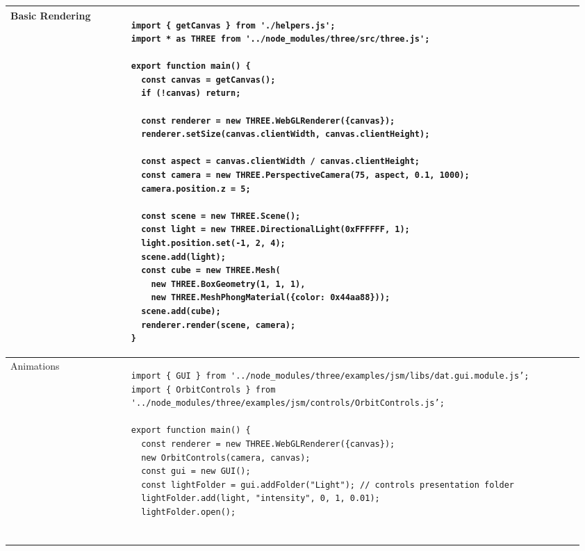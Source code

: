 \documentclass[main.tex,fontsize=8pt,paper=a4,paper=portrait,DIV=calc,]{scrartcl}
\begin{document}
\pagebreak
\begin{table}[ht!]
\begin{tabular}{|m{0.2\linewidth}|m{0.755\linewidth}|}
\hline
Basic Rendering & 
\begin{lstlisting}
import { getCanvas } from './helpers.js';
import * as THREE from '../node_modules/three/src/three.js';

export function main() {
  const canvas = getCanvas();
  if (!canvas) return;

  const renderer = new THREE.WebGLRenderer({canvas});
  renderer.setSize(canvas.clientWidth, canvas.clientHeight);
  
  const aspect = canvas.clientWidth / canvas.clientHeight;
  const camera = new THREE.PerspectiveCamera(75, aspect, 0.1, 1000);
  camera.position.z = 5;
  
  const scene = new THREE.Scene();
  const light = new THREE.DirectionalLight(0xFFFFFF, 1);
  light.position.set(-1, 2, 4);
  scene.add(light);
  const cube = new THREE.Mesh(
    new THREE.BoxGeometry(1, 1, 1),
    new THREE.MeshPhongMaterial({color: 0x44aa88}));
  scene.add(cube);
  renderer.render(scene, camera);
}
\end{lstlisting}\\
\hline
Animations & 
\begin{lstlisting}
import { GUI } from '../node_modules/three/examples/jsm/libs/dat.gui.module.js’;
import { OrbitControls } from '../node_modules/three/examples/jsm/controls/OrbitControls.js’;

export function main() {
  const renderer = new THREE.WebGLRenderer({canvas});
  new OrbitControls(camera, canvas);
  const gui = new GUI();
  const lightFolder = gui.addFolder("Light"); // controls presentation folder
  lightFolder.add(light, "intensity", 0, 1, 0.01);
  lightFolder.open();


\end{lstlisting}
\end{tabular}
\end{table}
\end{document}
